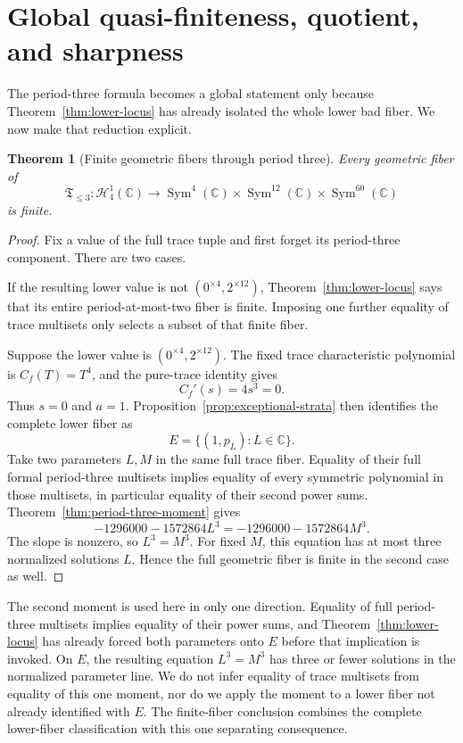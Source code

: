 \documentclass[11pt]{article}
\newtheorem{theorem}{Theorem}[section]
\theoremstyle{definition}
\newcommand{\C}{\mathbb C}
\newcommand{\Hn}{\mathcal H}
\newcommand{\Sym}{\operatorname{Sym}}
\begin{document}
\periodthreesection

\section{Global quasi-finiteness, quotient, and sharpness}
\label{sec:global}

The period-three formula becomes a global statement only because Theorem~\ref{thm:lower-locus} has already isolated the whole lower bad fiber. We now make that reduction explicit.

\begin{theorem}[Finite geometric fibers through period three]
\label{thm:finite-geometric-fibers}
Every geometric fiber of
\[
\mathfrak T_{\le3}:\Hn^1_4(\C)
\longrightarrow
\Sym^4(\C)\times\Sym^{12}(\C)\times\Sym^{60}(\C)
\]
is finite.
\end{theorem}

\begin{proof}
Fix a value of the full trace tuple and first forget its period-three component. There are two cases.

If the resulting lower value is not $(0^{\times4},2^{\times12})$, Theorem~\ref{thm:lower-locus} says that its entire period-at-most-two fiber is finite. Imposing one further equality of trace multisets only selects a subset of that finite fiber.

Suppose the lower value is $(0^{\times4},2^{\times12})$. The fixed trace characteristic polynomial is $C_f(T)=T^4$, and the pure-trace identity gives
\[
C_f'(s)=4s^3=0.
\]
Thus $s=0$ and $a=1$. Proposition~\ref{prop:exceptional-strata} then identifies the complete lower fiber as
\[
E=\{(1,p_L):L\in\C\}.
\]
Take two parameters $L,M$ in the same full trace fiber. Equality of their full formal period-three multisets implies equality of every symmetric polynomial in those multisets, in particular equality of their second power sums. Theorem~\ref{thm:period-three-moment} gives
\[
-1296000-1572864L^3
=
-1296000-1572864M^3.
\]
The slope is nonzero, so $L^3=M^3$. For fixed $M$, this equation has at most three normalized solutions $L$. Hence the full geometric fiber is finite in the second case as well.
\end{proof}

The second moment is used here in only one direction. Equality of full period-three multisets implies equality of their power sums, and Theorem~\ref{thm:lower-locus} has already forced both parameters onto $E$ before that implication is invoked. On $E$, the resulting equation $L^3=M^3$ has three or fewer solutions in the normalized parameter line. We do not infer equality of trace multisets from equality of this one moment, nor do we apply the moment to a lower fiber not already identified with $E$. The finite-fiber conclusion combines the complete lower-fiber classification with this one separating consequence.
\end{document}
